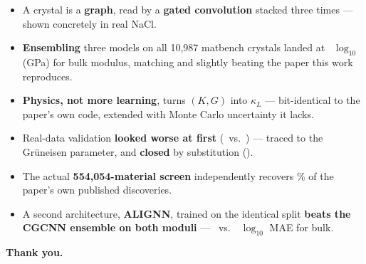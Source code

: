 \documentclass[aspectratio=169]{beamer}
\begin{document}
\begin{frame}

\sffamily\small
\begin{itemize}
\setlength\itemsep{4pt}
\item A crystal is a \textbf{graph}, read by a \textbf{gated convolution}
  stacked three times --- shown concretely in real NaCl.
\item \textbf{Ensembling} three models on all 10{,}987 matbench crystals
  landed at \KEnsMae\ $\log_{10}$(GPa) for bulk modulus, matching and
  slightly beating the paper this work reproduces.
\item \textbf{Physics, not more learning}, turns $(K,G)$ into $\kappa_L$
  --- bit-identical to the paper's own code, extended with Monte Carlo
  uncertainty it lacks.
\item Real-data validation \textbf{looked worse at first}
  (\TOneMaeOurs\ vs.\ \TOneMaePaper) --- traced to the Gr\"uneisen
  parameter, and \textbf{closed} by substitution (\TOneMaeCorrected).
\item The actual \textbf{554{,}054-material screen} independently recovers
  \GnPctOfPaper\% of the paper's own published discoveries.
\item A second architecture, \textbf{ALIGNN}, trained on the identical
  split \textbf{beats the CGCNN ensemble on both moduli} ---
  \AlignnKMae\ vs.\ \KEnsMae\ $\log_{10}$ MAE for bulk.
\end{itemize}

\vspace{4pt}
\begin{center}
{\headingfont\bfseries\Large\color{SlideInk} Thank you.}
\end{center}
\end{frame}
\end{document}
